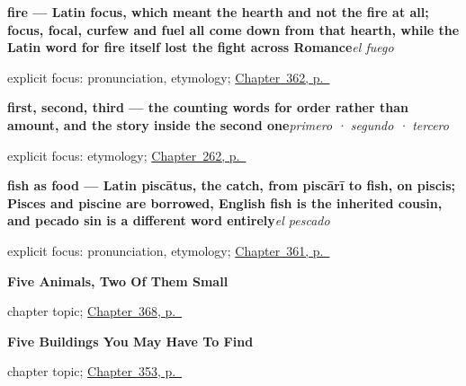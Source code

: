 \noindent\begin{minipage}[t]{\linewidth}
\raggedright
\textbf{fire — Latin focus, which meant the hearth and not the fire at all; focus, focal, curfew and fuel all come down from that hearth, while the Latin word for fire itself lost the fight across Romance}\enspace\emph{el fuego}\par
\footnotesize explicit focus: pronunciation, etymology; \hyperref[ch:la-tierra-y-el-mar]{Chapter~362, p.~\pageref*{ch:la-tierra-y-el-mar}}
\end{minipage}\par\smallskip

\noindent\begin{minipage}[t]{\linewidth}
\raggedright
\textbf{first, second, third — the counting words for order rather than amount, and the story inside the second one}\enspace\emph{primero · segundo · tercero}\par
\footnotesize explicit focus: etymology; \hyperref[ch:primero]{Chapter~262, p.~\pageref*{ch:primero}}
\end{minipage}\par\smallskip

\noindent\begin{minipage}[t]{\linewidth}
\raggedright
\textbf{fish as food — Latin piscātus, the catch, from piscārī to fish, on piscis; Pisces and piscine are borrowed, English fish is the inherited cousin, and pecado sin is a different word entirely}\enspace\emph{el pescado}\par
\footnotesize explicit focus: pronunciation, etymology; \hyperref[ch:la-carne-y-la-leche]{Chapter~361, p.~\pageref*{ch:la-carne-y-la-leche}}
\end{minipage}\par\smallskip

\noindent\begin{minipage}[t]{\linewidth}
\raggedright
\textbf{Five Animals, Two Of Them Small}\par
\footnotesize chapter topic; \hyperref[ch:la-abeja-y-la-mosca]{Chapter~368, p.~\pageref*{ch:la-abeja-y-la-mosca}}
\end{minipage}\par\smallskip

\noindent\begin{minipage}[t]{\linewidth}
\raggedright
\textbf{Five Buildings You May Have To Find}\par
\footnotesize chapter topic; \hyperref[ch:el-hospital-y-el-banco]{Chapter~353, p.~\pageref*{ch:el-hospital-y-el-banco}}
\end{minipage}\par\smallskip


